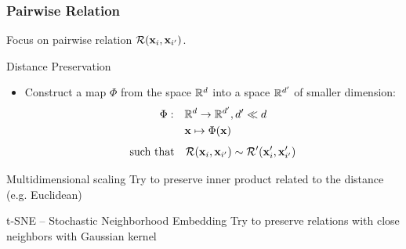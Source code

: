 \documentclass{beamer}\usepackage[]{graphicx}\usepackage[]{color}
\begin{document}
\begin{frame}
    \frametitle{Pairwise Relation}
  
    Focus on pairwise relation $\mathcal{R}(\mathbf{x}_i, \mathbf{x}_{i'})$.

    \begin{block}{Distance Preservation}
      \begin{itemize}
    \item  Construct a map $\Phi$ from the space $\mathbb{R}^{d}$ into a space $\mathbb{R}^{d'}$ of \alert{smaller dimension}:
      \begin{align*}
      \Phi:\quad & \mathbb{R}^d \to \mathbb{R}^{d'}, d' \ll d\\
               & \mathbf{x} \mapsto \Phi(\mathbf{x})
      \end{align*}
      \begin{equation*}
      \text{such that} \quad \mathcal{R}(\mathbf{x}_i, \mathbf{x}_{i'}) \sim\mathcal{R'}(\mathbf{x}'_i, \mathbf{x}'_{i'})
      \end{equation*}
    \end{itemize}
  \end{block}

  \begin{block}{Multidimensional scaling}
    Try to preserve inner product related to the distance (e.g. Euclidean)
  \end{block}

  \vfill
  
  \begin{block}{t-SNE -- Stochastic Neighborhood Embedding}
    Try to preserve relations with close neighbors with Gaussian kernel
  \end{block}

\end{frame}
\end{document}
